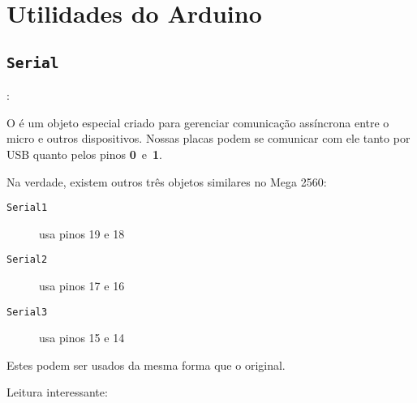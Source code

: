 \section{Utilidades do Arduino}


\subsection{\texttt{Serial}}


\begin{frame}[b]{\insertsection: \insertsubsection}

	O  é um objeto especial criado para gerenciar comunicação assíncrona entre o micro e outros dispositivos. Nossas placas podem se comunicar com ele tanto por USB quanto pelos pinos \textbf{0}~e~\textbf{1}.

	\medskip
	Na verdade, existem outros três objetos similares no Mega 2560:
	\begin{description}
		\item[\texttt{Serial1}] usa pinos 19 e 18
		\item[\texttt{Serial2}] usa pinos 17 e 16
		\item[\texttt{Serial3}] usa pinos 15 e 14
	\end{description}

Estes podem ser usados da mesma forma que o original.

	\vfill
	Leitura interessante: 

\end{frame}











